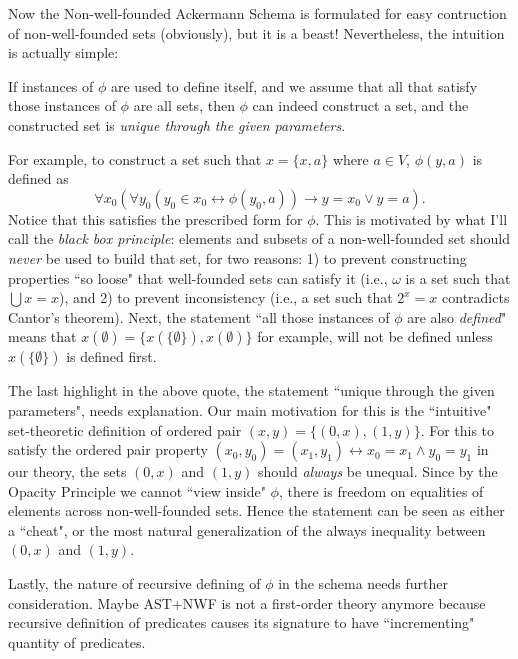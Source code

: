 \documentclass{article}
\begin{document}
Now the Non-well-founded Ackermann Schema is formulated for easy contruction of non-well-founded sets (obviously), but it is a beast! Nevertheless, the intuition is actually simple:

\begin{displayquote}
If instances of $\phi$ are used to define itself, and we assume that all that satisfy those instances of $\phi$ are all sets, then $\phi$ can indeed construct a set, and the constructed set is \textit{unique through the given parameters}.
\end{displayquote}

For example, to construct a set such that $x=\{x, a\}$ where $a \in V$, $\phi(y, a)$ is defined as $$\forall x_0 (\forall y_0 (y_0 \in x_0 \leftrightarrow \phi(y_0, a)) \rightarrow y = x_0 \vee y = a).$$ Notice that this satisfies the prescribed form for $\phi$. This is motivated by what I'll call the \textit{black box principle}: elements and subsets of a non-well-founded set should \textit{never} be used to build that set, for two reasons: 1) to prevent constructing properties ``so loose" that well-founded sets can satisfy it (i.e., $\omega$ is a set such that $\bigcup x = x$), and 2) to prevent inconsistency (i.e., a set such that $2^x = x$ contradicts Cantor's theorem). Next, the statement ``all those instances of $\phi$ are also \textit{defined}" means that $x(\emptyset) = \{x(\{\emptyset\}), x(\emptyset)\}$ for example, will not be defined unless $x(\{\emptyset\})$ is defined first.

The last highlight in the above quote, the statement ``unique through the given parameters", needs explanation. Our main motivation for this is the ``intuitive" set-theoretic definition of ordered pair $(x,y) = \{(0,x), (1, y)\}$. For this to satisfy the ordered pair property $(x_0,y_0) = (x_1, y_1) \leftrightarrow x_0 = x_1 \wedge y_0 = y_1$ in our theory, the sets $(0,x)$ and $(1,y)$ should \textit{always} be unequal. Since by the Opacity Principle we cannot ``view inside" $\phi$, there is freedom on equalities of elements across non-well-founded sets. Hence the statement can be seen as either a ``cheat", or the most natural generalization of the always inequality between $(0,x)$ and $(1,y)$.

Lastly, the nature of recursive defining of $\phi$ in the schema needs further consideration. Maybe \textsf{AST+NWF} is not a first-order theory anymore because recursive definition of predicates causes its signature to have ``incrementing" quantity of predicates.
\end{document}
